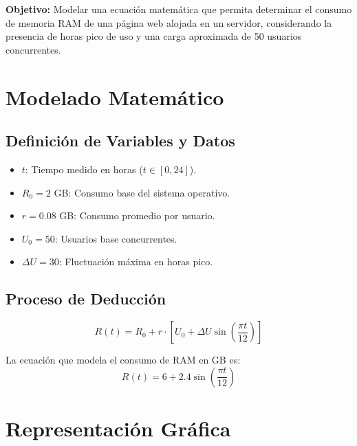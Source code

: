 \documentclass[12pt,a4paper]{article}
\begin{document}
\begin{cajaconcepto}
\textbf{Objetivo:} Modelar una ecuación matemática que permita determinar el consumo de memoria RAM de una página web alojada en un servidor, considerando la presencia de horas pico de uso y una carga aproximada de 50 usuarios concurrentes.
\end{cajaconcepto}

\section{Modelado Matemático}

\subsection{Definición de Variables y Datos}
\begin{itemize}
    \item $t$: Tiempo medido en horas ($t \in [0,24]$).
    \item $R_0 = 2$ GB: Consumo base del sistema operativo.
    \item $r = 0.08$ GB: Consumo promedio por usuario.
    \item $U_0 = 50$: Usuarios base concurrentes.
    \item $\Delta U = 30$: Fluctuación máxima en horas pico.
\end{itemize}

\subsection{Proceso de Deducción}
\[
R(t) = R_0 + r \cdot \left[ U_0 + \Delta U \sin\left(\frac{\pi t}{12}\right) \right]
\]

\begin{cajaresultado}
La ecuación que modela el consumo de RAM en GB es:
\[
R(t) = 6 + 2.4\sin\left(\frac{\pi t}{12}\right)
\]
\end{cajaresultado}

\section{Representación Gráfica}

\begin{center}
\end{center}
\end{document}
